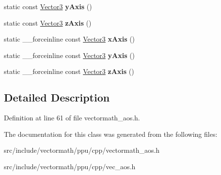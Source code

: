 \begin{DoxyCompactItemize}
\item 
\hypertarget{classVectormath_1_1Aos_1_1Vector3_a294d0afafac74a08da052b0634933c8d}{static const \hyperlink{classVectormath_1_1Aos_1_1Vector3}{Vector3} {\bfseries y\-Axis} ()}\label{classVectormath_1_1Aos_1_1Vector3_a294d0afafac74a08da052b0634933c8d}

\item 
\hypertarget{classVectormath_1_1Aos_1_1Vector3_adb1dcbe829b75d5a1b6e57e7dc283394}{static const \hyperlink{classVectormath_1_1Aos_1_1Vector3}{Vector3} {\bfseries z\-Axis} ()}\label{classVectormath_1_1Aos_1_1Vector3_adb1dcbe829b75d5a1b6e57e7dc283394}

\item 
\hypertarget{classVectormath_1_1Aos_1_1Vector3_a54c000c5895b54b8f74c10ddfa29114d}{static \-\_\-\-\_\-forceinline const \hyperlink{classVectormath_1_1Aos_1_1Vector3}{Vector3} {\bfseries x\-Axis} ()}\label{classVectormath_1_1Aos_1_1Vector3_a54c000c5895b54b8f74c10ddfa29114d}

\item 
\hypertarget{classVectormath_1_1Aos_1_1Vector3_aca57ff5da23a971af9e91dc344581b08}{static \-\_\-\-\_\-forceinline const \hyperlink{classVectormath_1_1Aos_1_1Vector3}{Vector3} {\bfseries y\-Axis} ()}\label{classVectormath_1_1Aos_1_1Vector3_aca57ff5da23a971af9e91dc344581b08}

\item 
\hypertarget{classVectormath_1_1Aos_1_1Vector3_ad3eb745e15de237c0e3d2708d135abab}{static \-\_\-\-\_\-forceinline const \hyperlink{classVectormath_1_1Aos_1_1Vector3}{Vector3} {\bfseries z\-Axis} ()}\label{classVectormath_1_1Aos_1_1Vector3_ad3eb745e15de237c0e3d2708d135abab}

\end{DoxyCompactItemize}


\subsection{Detailed Description}


Definition at line 61 of file vectormath\-\_\-aos.\-h.



The documentation for this class was generated from the following files\-:\begin{DoxyCompactItemize}
\item 
src/include/vectormath/ppu/cpp/vectormath\-\_\-aos.\-h\item 
src/include/vectormath/ppu/cpp/vec\-\_\-aos.\-h\end{DoxyCompactItemize}
